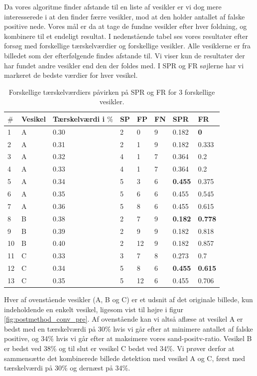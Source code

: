 Da vores algoritme finder afstande til en liste af vesikler er vi dog mere interesserede i at den finder færre vesikler, mod at den holder antallet af falske positive nede. Vores mål er da at tage de fundne vesikler efter hver foldning, og kombinere til et endeligt resultat. I nedenstående tabel ses vores resultater efter forsøg med forskellige tærskelværdier og forskellige  vesikler. Alle vesiklerne er fra billedet som der efterfølgende findes afstande til. Vi viser kun de resultater der har fundet andre vesikler end den der foldes med. I SPR og FR søjlerne har vi markeret de bedste værdier for hver vesikel.
\begin{table}[H]
	\centering
\begin{tabular}{l|l|l|l|l|l|l|l}
	$\#$ & Vesikel & Tærskelværdi i $\%$ & SP & FP & FN & SPR & FR \\\hline
	1	&	A	&	0.30	& 2		& 0		&9 	&0.182 			&\textbf{0}\\\hline
	2	&	A	&	0.31	& 2		& 1		&9 	&0.182 			&0.333\\\hline
	3	&	A	&	0.32	& 4		& 1		&7  &0.364 			&0.2\\\hline
	4	&	A	&	0.33	& 4		& 1		&7  &0.364 			&0.2\\\hline
	5	&	A	&	0.34	& 5		& 3		&6  &\textbf{0.455}	&0.375\\\hline
	6	&	A	&	0.35	& 5		& 6		&6  &0.455 			&0.545\\\hline
	7	&	A	&	0.36	& 5		& 8		&6  &0.455			&0.615\\\hline	
	8	&	B	&	0.38	& 2		& 7		&9 	&\textbf{0.182}	&\textbf{0.778}\\\hline
	9	&	B	&	0.39	& 2		& 9		&9 	&0.182 			&0.818\\\hline
	10	&	B	&	0.40	& 2		& 12	&9 	&0.182 			&0.857\\\hline	
	11	&	C	&	0.33	& 3		& 7		&8 	&0.273 			&0.7\\\hline
	12	&	C	&	0.34	& 5		& 8		&6 	&\textbf{0.455}	&\textbf{0.615}\\\hline
	13	&	C	&	0.35	& 5		& 12	&6 	&0.455 			&0.706
\end{tabular}
\caption{Forskellige tærskelværdiers påvirken på SPR og FR for 3 forskellige vesikler.\label{tab:postmethod_tabelll}}
\end{table}

Hver af ovenstående vesikler (A, B og C) er et udsnit af det originale billede, kun indeholdende en enkelt vesikel, ligesom vist til højre i figur \ref{fig:postmethod_conv_pre}. Af ovenstående kan vi altså aflæse at vesikel A er bedst med en tærskelværdi på 30\% hvis vi går efter at minimere antallet af falske positive, og 34\% hvis vi går efter at maksimere vores sand-positv-ratio. Vesikel B er bedst ved 38\% og til slut er vesikel C bedst ved 34\%. Vi prøver derfor at sammensætte det kombinerede billede detektion med vesikel A og C, først med tærskelværdi på 30\% og dernæst på 34\%. 


